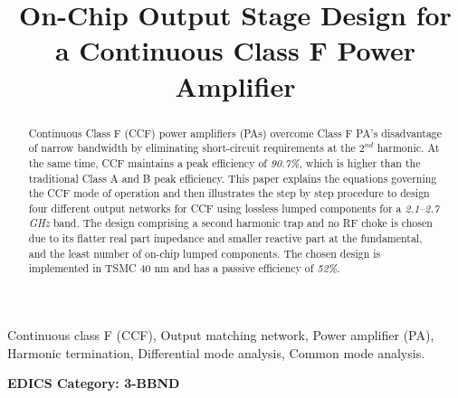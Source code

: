 \documentclass[conference]{IEEEtran}
\begin{document}
\title{On-Chip Output Stage Design for a  Continuous Class F Power Amplifier}

\author{ 
}

\maketitle

\begin{abstract}
Continuous Class F (CCF) power amplifiers (PAs) overcome Class F PA's disadvantage of narrow bandwidth by eliminating short-circuit requirements at the $2^{nd}$ harmonic. At the same time, CCF maintains a peak efficiency of \textit{90.7\%}, which is higher than the traditional Class A and B peak efficiency. This paper explains the equations governing the CCF mode of operation and then illustrates the step by step procedure to design  four different output networks for CCF using lossless lumped components for a \textit{2.1--2.7 GHz} band.
The design comprising a second harmonic trap and no RF choke is chosen due to its flatter real part impedance and smaller reactive part at the fundamental, and  the least number of on-chip lumped components.
\color{blue}The chosen design is implemented in TSMC 40 nm and has a passive efficiency of \textit{52\%}.\color{black} 
\end{abstract}

\vspace{1mm}
\begin{IEEEkeywords}
Continuous class F (CCF), Output matching network, Power amplifier (PA), Harmonic termination, Differential mode analysis, Common mode analysis. 
\end{IEEEkeywords}


\ifCLASSOPTIONpeerreview
\begin{center} \bfseries EDICS Category: 3-BBND \end{center}
\fi

\IEEEpeerreviewmaketitle
\end{document}
